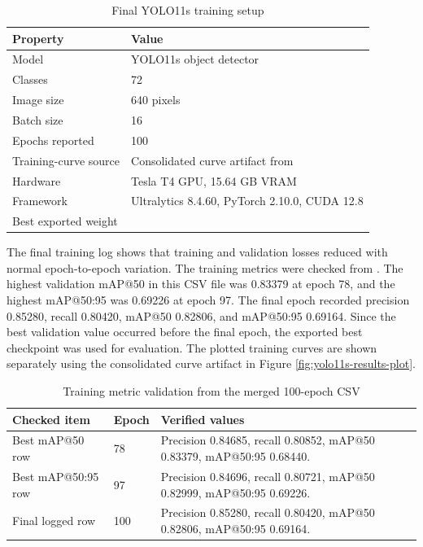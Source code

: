 \begin{table}[H]
\centering
\caption{Final YOLO11s training setup}
\label{tab:yolo-training-setup}
\begin{tabularx}{\textwidth}{L{0.34\textwidth}Y}
\toprule
Property & Value\\
\midrule
Model & YOLO11s object detector\\
Classes & 72\\
Image size & 640 pixels\\
Batch size & 16\\
Epochs reported & 100\\
Training-curve source & Consolidated curve artifact from \\
Hardware & Tesla T4 GPU, 15.64 GB VRAM\\
Framework & Ultralytics 8.4.60, PyTorch 2.10.0, CUDA 12.8\\
Best exported weight & \\
\bottomrule
\end{tabularx}
\end{table}

The final training log shows that training and validation losses reduced with normal epoch-to-epoch variation. The training metrics were checked from . The highest validation mAP@50 in this CSV file was 0.83379 at epoch 78, and the highest mAP@50:95 was 0.69226 at epoch 97. The final epoch recorded precision 0.85280, recall 0.80420, mAP@50 0.82806, and mAP@50:95 0.69164. Since the best validation value occurred before the final epoch, the exported best checkpoint was used for evaluation. The plotted training curves are shown separately using the consolidated curve artifact in Figure \ref{fig:yolo11s-results-plot}.

\begin{table}[H]
\centering
\caption{Training metric validation from the merged 100-epoch CSV}
\label{tab:training-metric-validation}
\begin{tabularx}{\textwidth}{L{0.35\textwidth}L{0.18\textwidth}Y}
\toprule
Checked item & Epoch & Verified values\\
\midrule
Best mAP@50 row & 78 & Precision 0.84685, recall 0.80852, mAP@50 0.83379, mAP@50:95 0.68440.\\
Best mAP@50:95 row & 97 & Precision 0.84696, recall 0.80721, mAP@50 0.82999, mAP@50:95 0.69226.\\
Final logged row & 100 & Precision 0.85280, recall 0.80420, mAP@50 0.82806, mAP@50:95 0.69164.\\
\bottomrule
\end{tabularx}
\end{table}

